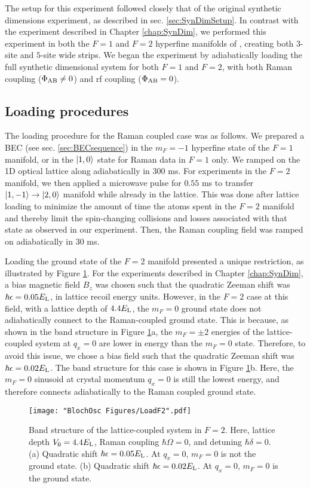 The setup for this experiment followed closely that of the original synthetic dimensions experiment, as described in sec. \ref{sec:SynDimSetup}. In contrast with the experiment described in Chapter \ref{chap:SynDim}, we performed this experiment in both the $F=1$ and $F=2$ hyperfine manifolds of \Rb{}, creating both $3$-site and $5$-site wide strips. We began the experiment by adiabatically loading the full synthetic dimensional system for both $F=1$ and $F=2$, with both Raman coupling ($\Phi_{\rm AB}\neq0$) and rf coupling ($\Phi_{\rm AB}=0$). 

\subsection{Loading procedures}
The loading procedure for the Raman coupled case was  as follows. We prepared a \Rb{} BEC (see sec. \ref{sec:BECsequence}) in the $m_F=-1$ hyperfine state of the $F=1$ manifold, or in the $\mathinner{|{1,0}\rangle}$ state for Raman data in $F=1$ only. We ramped on the 1D optical lattice along \ex{} adiabatically in $300$ ms. For experiments in the $F=2$ manifold, we then applied a microwave pulse for $0.55$ ms to transfer $\mathinner{|{1,-1}\rangle}\rightarrow\mathinner{|{2,0}\rangle}$ manifold while already in the lattice. This was done after lattice loading to minimize the amount of time the atoms spent in the $F=2$ manifold and thereby limit the spin-changing collisions and losses associated with that state as observed in our experiment.   Then, the Raman coupling field was ramped on adiabatically in $30$ ms.

Loading the ground state of the $F=2$ manifold presented a unique restriction, as illustrated by Figure \ref{fig:LoadF2}. For the experiments described in Chapter \ref{chap:SynDim}, a bias magnetic field $B_z$ was chosen such that the quadratic Zeeman shift was $\hbar\epsilon = 0.05 E_{\rm L}$, in lattice recoil energy units. However, in the $F=2$ case at this field, with a lattice depth of $4.4 E_{\rm L}$, the $m_F=0$ ground state does not adiabatically connect to the Raman-coupled ground state. This is because, as shown in the band structure in Figure \ref{fig:LoadF2}a, the $m_F=\pm2$ energies of the lattice-coupled system at $q_x=0$ are lower in energy than the $m_F=0$ state. Therefore, to avoid this issue, we chose a bias field such that the quadratic Zeeman shift was $\hbar\epsilon = 0.02 E_{\rm L}$. The band structure for this case is shown in Figure \ref{fig:LoadF2}b. Here, the $m_F=0$ sinusoid at crystal momentum $q_x=0$ is still the lowest energy, and therefore connects adiabatically to the Raman coupled ground state. 
\begin{figure}
\texttt{[image: "BlochOsc Figures/LoadF2".pdf]}
\caption[Band structure of the lattice-coupled system in $F=2$]{Band structure of the lattice-coupled system in $F=2$. Here, lattice depth $V_0=4.4 E_{\rm L}$, Raman coupling $\hbar\Omega=0$, and detuning $\hbar\delta=0$. (a) Quadratic shift $\hbar\epsilon=0.05 E_{\rm L}$. At $q_x=0$, $m_F=0$ is not the ground state. (b) Quadratic shift $\hbar\epsilon = 0.02 E_{\rm L}$.  At $q_x=0$, $m_F=0$ is the ground state.}
\label{fig:LoadF2}
\end{figure}

